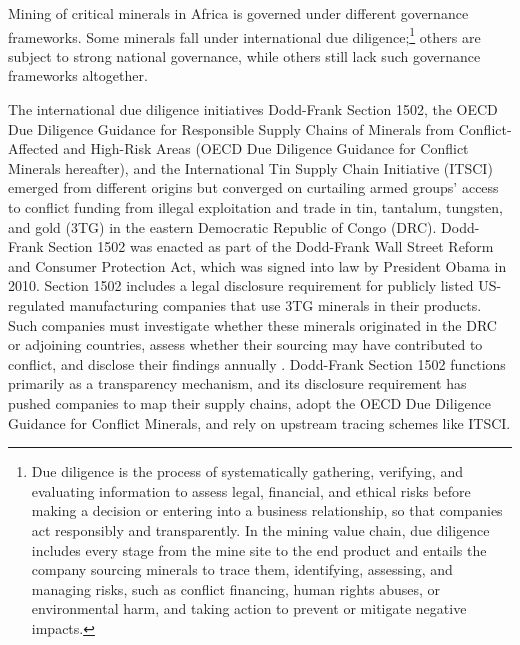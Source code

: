 \documentclass[11pt]{article}
\begin{document}
Mining of critical minerals in Africa is governed under different governance frameworks. Some minerals fall under international due diligence;\footnote{Due diligence is the process of systematically gathering, verifying, and evaluating information to assess legal, financial, and ethical risks before making a decision or entering into a business relationship, so that companies act responsibly and transparently. In the mining value chain, due diligence includes every stage from the mine site to the end product and entails the company sourcing minerals to trace them, identifying, assessing, and managing risks, such as conflict financing, human rights abuses, or environmental harm, and taking action to prevent or mitigate negative impacts.} others are subject to strong national governance, while others still lack such governance frameworks altogether.

The international due diligence initiatives Dodd-Frank Section 1502, the OECD Due Diligence Guidance for Responsible Supply Chains of Minerals from Conflict-Affected and High-Risk Areas (OECD Due Diligence Guidance for Conflict Minerals hereafter), and the International Tin Supply Chain Initiative (ITSCI) emerged from different origins but converged on curtailing armed groups' access to conflict funding from illegal exploitation and trade in tin, tantalum, tungsten, and gold (3TG) in the eastern Democratic Republic of Congo (DRC). Dodd-Frank Section 1502 was enacted as part of the Dodd-Frank Wall Street Reform and Consumer Protection Act, which was signed into law by President Obama in 2010. Section 1502 includes a legal disclosure requirement for publicly listed US-regulated manufacturing companies that use 3TG minerals in their products. Such companies must investigate whether these minerals originated in the DRC or adjoining countries, assess whether their sourcing may have contributed to conflict, and disclose their findings annually \citep{whitney2015conflict}. Dodd-Frank Section 1502 functions primarily as a transparency mechanism, and its disclosure requirement has pushed companies to map their supply chains, adopt the OECD Due Diligence Guidance for Conflict Minerals, and rely on upstream tracing schemes like ITSCI.
\end{document}
